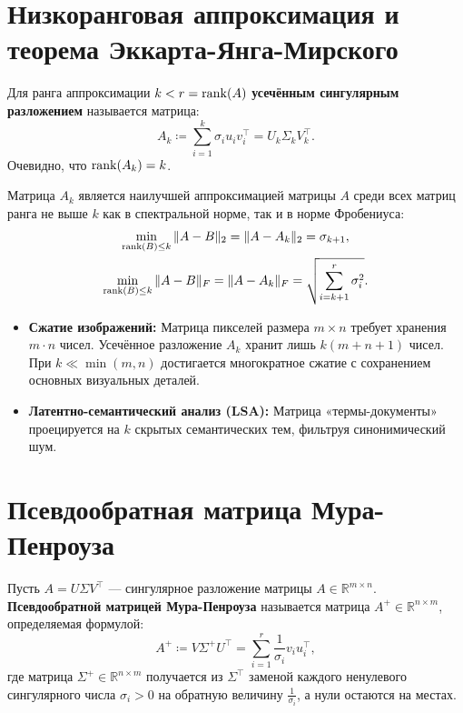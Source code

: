    \section{Низкоранговая аппроксимация и теорема Эккарта-Янга-Мирского}

    \begin{definition}
Для ранга аппроксимации $k < r = \operatorname{rank}(A)$ \textbf{усечённым сингулярным разложением} называется матрица:
\[ A_k \coloneqq \sum_{i=1}^k \sigma_i u_i v_i^\top = U_k \Sigma_k V_k^\top. \]
Очевидно, что $\operatorname{rank}(A_k) = k$.
    \end{definition}

    \begin{theorem}
Матрица $A_k$ является наилучшей аппроксимацией матрицы $A$ среди всех матриц ранга не выше $k$ как в спектральной
норме, так и в норме Фробениуса:
\begin{gather*}
    \min_{\operatorname{rank}(B) \le k} \|A - B\|_2 = \|A - A_k\|_2 = \sigma_{k+1},\\
    \min_{\operatorname{rank}(B) \le k} \|A - B\|_F = \|A - A_k\|_F = \sqrt{\sum_{i=k+1}^r \sigma_i^2}.\\
\end{gather*}
    \end{theorem}

    \begin{example}
\begin{itemize}
    \item \textbf{Сжатие изображений:} Матрица пикселей размера $m \times n$ требует хранения $m \cdot n$ чисел.
    Усечённое разложение $A_k$ хранит лишь $k(m + n + 1)$ чисел.
    При $k \ll \min(m, n)$ достигается многократное сжатие с сохранением основных визуальных деталей.
    \item \textbf{Латентно-семантический анализ (LSA):} Матрица «термы-документы» проецируется на $k$ скрытых
    семантических тем, фильтруя синонимический шум.
\end{itemize}
    \end{example}

    \section{Псевдообратная матрица Мура-Пенроуза}

    \begin{definition}
Пусть $A = U \Sigma V^\top$ — сингулярное разложение матрицы $A \in \mathbb{R}^{m \times n}$.
\textbf{Псевдообратной матрицей Мура-Пенроуза} называется матрица $A^+ \in \mathbb{R}^{n \times m}$, определяемая
формулой:
\[ A^+ \coloneqq V \Sigma^+ U^\top = \sum_{i=1}^r \frac{1}{\sigma_i} v_i u_i^\top, \]
где матрица $\Sigma^+ \in \mathbb{R}^{n \times m}$ получается из $\Sigma^\top$ заменой каждого ненулевого сингулярного
числа $\sigma_i > 0$ на обратную величину $\frac{1}{\sigma_i}$, а нули остаются на местах.
    \end{definition}

